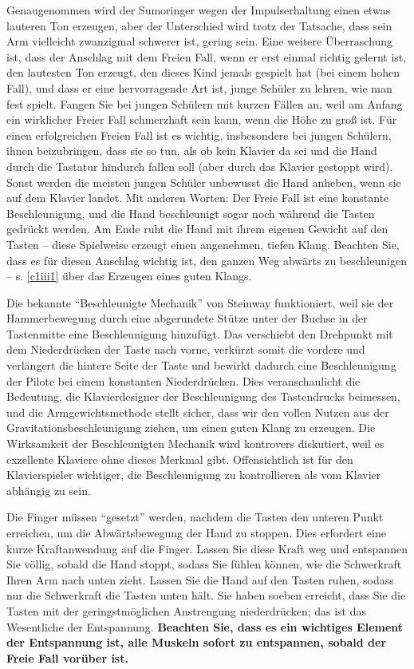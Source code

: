 Genaugenommen wird der Sumoringer wegen der Impulserhaltung einen etwas lauteren Ton erzeugen, aber der Unterschied wird trotz der Tatsache, dass sein Arm vielleicht zwanzigmal schwerer ist, gering sein.
Eine weitere Überraschung ist, dass der Anschlag mit dem Freien Fall, wenn er erst einmal richtig gelernt ist, den lautesten Ton erzeugt, den dieses Kind jemals gespielt hat (bei einem hohen Fall), und dass er eine hervorragende Art ist, junge Schüler zu lehren, wie man fest spielt.
Fangen Sie bei jungen Schülern mit kurzen Fällen an, weil am Anfang ein wirklicher Freier Fall schmerzhaft sein kann, wenn die Höhe zu groß ist.
Für einen erfolgreichen Freien Fall ist es wichtig, insbesondere bei jungen Schülern, ihnen beizubringen, dass sie so tun, als ob kein Klavier da sei und die Hand durch die Tastatur hindurch fallen soll (aber durch das Klavier gestoppt wird).
Sonst werden die meisten jungen Schüler unbewusst die Hand anheben, wenn sie auf dem Klavier landet.
Mit anderen Worten: Der Freie Fall ist eine konstante Beschleunigung, und die Hand beschleunigt sogar noch während die Tasten gedrückt werden.
Am Ende ruht die Hand mit ihrem eigenen Gewicht auf den Tasten -- diese Spielweise erzeugt einen angenehmen, tiefen Klang.
Beachten Sie, dass es für diesen Anschlag wichtig ist, den ganzen Weg abwärts zu beschleunigen -- s. \hyperref[c1iii1]{\autoref{c1iii1}} über das Erzeugen eines guten Klangs.

Die bekannte \enquote{Beschleunigte Mechanik} von Steinway funktioniert, weil sie der Hammerbewegung durch eine abgerundete Stütze unter der Buchse in der Tastenmitte eine Beschleunigung hinzufügt.
Das verschiebt den Drehpunkt mit dem Niederdrücken der Taste nach vorne, verkürzt somit die vordere und verlängert die hintere Seite der Taste und bewirkt dadurch eine Beschleunigung der Pilote bei einem konstanten Niederdrücken.
Dies veranschaulicht die Bedeutung, die Klavierdesigner der Beschleunigung des Tastendrucks beimessen, und die Armgewichtsmethode stellt sicher, dass wir den vollen Nutzen aus der Gravitationsbeschleunigung ziehen, um einen guten Klang zu erzeugen.
Die Wirksamkeit der Beschleunigten Mechanik wird kontrovers diskutiert, weil es exzellente Klaviere ohne dieses Merkmal gibt.
Offensichtlich ist für den Klavierspieler wichtiger, die Beschleunigung zu kontrollieren als vom Klavier abhängig zu sein.

Die Finger müssen \enquote{gesetzt} werden, nachdem die Tasten den unteren Punkt erreichen, um die Abwärtsbewegung der Hand zu stoppen.
Dies erfordert eine kurze Kraftanwendung auf die Finger.
Lassen Sie diese Kraft weg und entspannen Sie völlig, sobald die Hand stoppt, sodass Sie fühlen können, wie die Schwerkraft Ihren Arm nach unten zieht.
Lassen Sie die Hand auf den Tasten ruhen, sodass nur die Schwerkraft die Tasten unten hält.
Sie haben soeben erreicht, dass Sie die Tasten mit der geringstmöglichen Anstrengung niederdrücken; das ist das Wesentliche der Entspannung.
\textbf{Beachten Sie, dass es ein wichtiges Element der Entspannung ist, alle Muskeln sofort zu entspannen, sobald der Freie Fall vorüber ist.}

